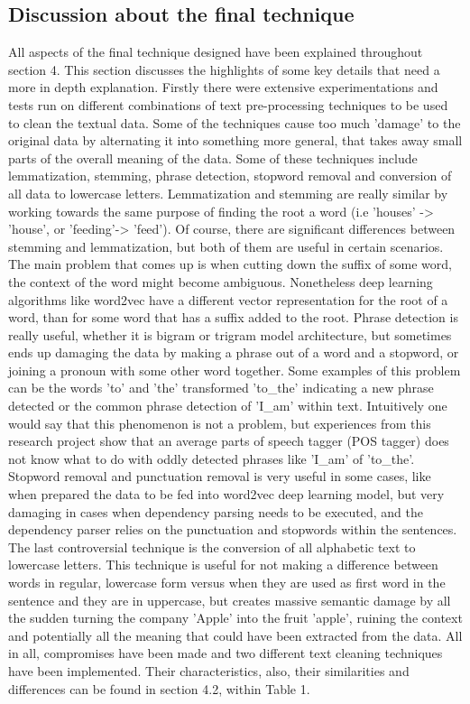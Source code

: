 \documentclass{sig-alternate}
\begin{document}
\subsection{Discussion about the final technique}
All aspects of the final technique designed have been explained throughout section 4. This section discusses the highlights of some key details that need a more in depth explanation.
Firstly there were extensive experimentations and tests run on different combinations of text pre-processing techniques to be used to clean the textual data. Some of the techniques cause too much 'damage' to the original data by alternating it into something more general, that takes away small parts of the overall meaning of the data. Some of these techniques include lemmatization, stemming, phrase detection, stopword removal and conversion of all data to lowercase letters. Lemmatization and stemming are really similar by working towards the same purpose of finding the root a word (i.e 'houses' -> 'house', or 'feeding'-> 'feed'). Of course, there are significant differences between stemming and lemmatization, but both of them are useful in certain scenarios. The main problem that comes up is when cutting down the suffix of some word, the context of the word might become ambiguous. Nonetheless deep learning algorithms like word2vec have a different vector representation for the root of a word, than for some word that has a suffix added to the root. Phrase detection is really useful, whether it is bigram or trigram model architecture, but sometimes ends up damaging the data by making a phrase out of a word and a stopword, or joining a pronoun with some other word together. Some examples of this problem can be the words 'to' and 'the' transformed 'to\_the' indicating a new phrase detected or the common phrase detection of 'I\_am' within text. Intuitively one would say that this phenomenon is not a problem, but experiences from this research project show that an average parts of speech tagger (POS tagger) does not know what to do with oddly detected phrases like 'I\_am' of 'to\_the'. Stopword removal and punctuation removal is very useful in some cases, like when prepared the data to be fed into word2vec deep learning model, but very damaging in cases when dependency parsing needs to be executed, and the dependency parser relies on the punctuation and stopwords within the sentences. The last controversial technique is the conversion of all alphabetic text to lowercase letters. This technique is useful for not making a difference between words in regular, lowercase form versus when they are used as first word in the sentence and they are in uppercase, but creates massive semantic damage by all the sudden turning the company 'Apple' into the fruit 'apple', ruining the context and potentially all the meaning that could have been extracted from the data. All in all, compromises have been made and two different text cleaning techniques have been implemented. Their characteristics, also, their similarities and differences can be found in section 4.2, within Table 1.
\end{document}
